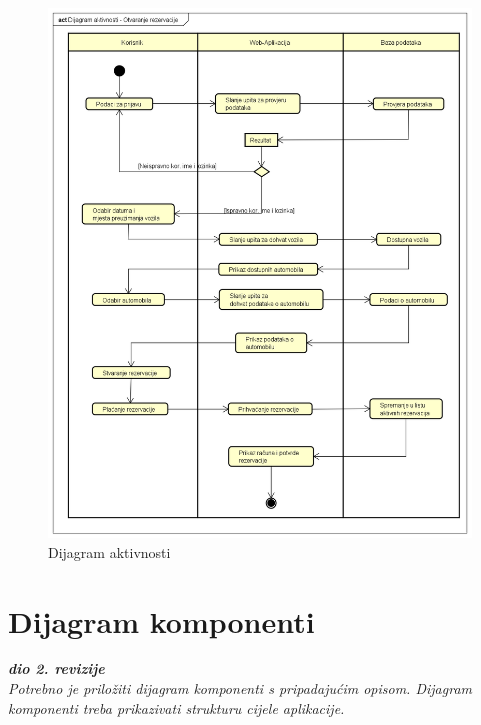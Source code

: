 			\begin{figure}[hp]
                    \centering
                    \includegraphics[width=16cm]{slike/Dijagram_aktivnosti.png}
                    \caption{Dijagram aktivnosti}
                    \label{fig:DA_01}
                \end{figure}
			
			 
			\eject
		\section{Dijagram komponenti}
		
			\textbf{\textit{dio 2. revizije}}\\
		
			 \textit{Potrebno je priložiti dijagram komponenti s pripadajućim opisom. Dijagram komponenti treba prikazivati strukturu cijele aplikacije.}